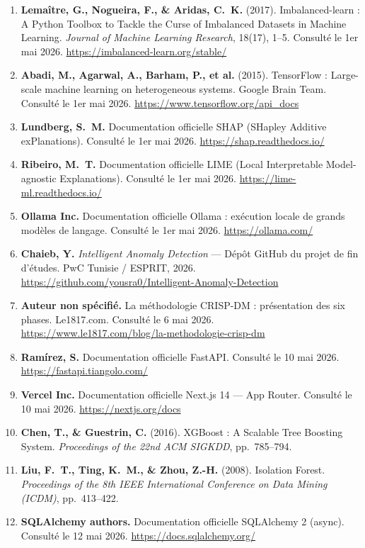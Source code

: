 \documentclass[12pt,a4paper,twoside]{report}
\begin{document}
\begin{enumerate}
  \item \textbf{Lemaître, G., Nogueira, F., \& Aridas, C.~K.} (2017). Imbalanced-learn : A Python Toolbox to Tackle the Curse of Imbalanced Datasets in Machine Learning. \textit{Journal of Machine Learning Research}, 18(17), 1--5. Consulté le 1er mai 2026. \url{https://imbalanced-learn.org/stable/}

  \item \textbf{Abadi, M., Agarwal, A., Barham, P., et al.} (2015). TensorFlow : Large-scale machine learning on heterogeneous systems. Google Brain Team. Consulté le 1er mai 2026. \url{https://www.tensorflow.org/api_docs}

  \item \textbf{Lundberg, S.~M.} Documentation officielle SHAP (SHapley Additive exPlanations). Consulté le 1er mai 2026. \url{https://shap.readthedocs.io/}

  \item \textbf{Ribeiro, M.~T.} Documentation officielle LIME (Local Interpretable Model-agnostic Explanations). Consulté le 1er mai 2026. \url{https://lime-ml.readthedocs.io/}

  \item \textbf{Ollama Inc.} Documentation officielle Ollama : exécution locale de grands modèles de langage. Consulté le 1er mai 2026. \url{https://ollama.com/}

  \item \textbf{Chaieb, Y.} \textit{Intelligent Anomaly Detection} --- Dépôt GitHub du projet de fin d'études. PwC Tunisie / ESPRIT, 2026. \url{https://github.com/yousra0/Intelligent-Anomaly-Detection}

  \item \textbf{Auteur non spécifié.} La méthodologie CRISP-DM : présentation des six phases. Le1817.com. Consulté le 6 mai 2026. \url{https://www.le1817.com/blog/la-methodologie-crisp-dm}

  \item \textbf{Ramírez, S.} Documentation officielle FastAPI. Consulté le 10 mai 2026. \url{https://fastapi.tiangolo.com/}

  \item \textbf{Vercel Inc.} Documentation officielle Next.js 14 — App Router. Consulté le 10 mai 2026. \url{https://nextjs.org/docs}

  \item \textbf{Chen, T., \& Guestrin, C.} (2016). XGBoost : A Scalable Tree Boosting System. \textit{Proceedings of the 22nd ACM SIGKDD}, pp.~785--794.

  \item \textbf{Liu, F.~T., Ting, K.~M., \& Zhou, Z.-H.} (2008). Isolation Forest. \textit{Proceedings of the 8th IEEE International Conference on Data Mining (ICDM)}, pp.~413--422.

  \item \textbf{SQLAlchemy authors.} Documentation officielle SQLAlchemy 2 (async). Consulté le 12 mai 2026. \url{https://docs.sqlalchemy.org/}

\end{enumerate}
\end{document}
